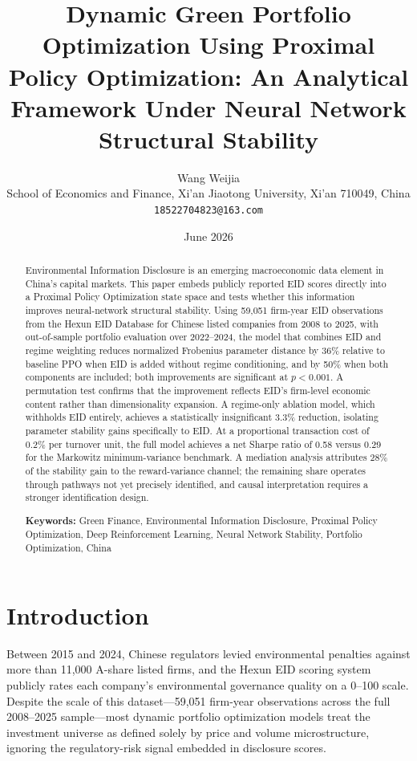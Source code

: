 \documentclass[12pt]{article}
\title{\textbf{Dynamic Green Portfolio Optimization Using Proximal Policy
Optimization: An Analytical Framework Under Neural Network Structural
Stability}}
\author{Wang Weijia \\
\small School of Economics and Finance, Xi'an Jiaotong University,
Xi'an 710049, China \\
\small \texttt{18522704823@163.com}}
\date{June 2026}
\begin{document}
\maketitle

\begin{abstract}
Environmental Information Disclosure is an emerging macroeconomic data
element in China's capital markets. This paper embeds publicly reported
EID scores directly into a Proximal Policy Optimization state space and
tests whether this information improves neural-network structural
stability. Using 59,051 firm-year EID observations from the Hexun EID
Database for Chinese listed companies from 2008 to 2025, with
out-of-sample portfolio evaluation over 2022--2024, the model that
combines EID and regime weighting reduces normalized Frobenius parameter
distance by 36\% relative to baseline PPO when EID is added without
regime conditioning, and by 50\% when both components are included; both
improvements are significant at $p<0.001$. A permutation test confirms
that the improvement reflects EID's firm-level economic content rather
than dimensionality expansion. A regime-only ablation model, which
withholds EID entirely, achieves a statistically insignificant 3.3\%
reduction, isolating parameter stability gains specifically to EID. At a
proportional transaction cost of 0.2\% per turnover unit, the full model
achieves a net Sharpe ratio of 0.58 versus 0.29 for the Markowitz
minimum-variance benchmark. A mediation analysis attributes 28\% of the
stability gain to the reward-variance channel; the remaining share
operates through pathways not yet precisely identified, and causal
interpretation requires a stronger identification design.

\medskip
\noindent\textbf{Keywords:} Green Finance, Environmental Information
Disclosure, Proximal Policy Optimization, Deep Reinforcement Learning,
Neural Network Stability, Portfolio Optimization, China
\end{abstract}

\section{Introduction}
\label{sec:intro}

Between 2015 and 2024, Chinese regulators levied environmental
penalties against more than 11,000 A-share listed firms, and the
Hexun EID scoring system publicly rates each company's environmental
governance quality on a 0--100 scale. Despite the scale of this
dataset---59,051 firm-year observations across the full 2008--2025
sample---most dynamic portfolio optimization models treat the
investment universe as defined solely by price and volume
microstructure, ignoring the regulatory-risk signal embedded in
disclosure scores.
\end{document}
